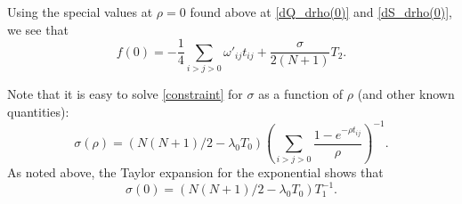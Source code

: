 \documentclass[12pt,leqno]{article}
\begin{document}
Using the special values at $\rho=0$ found above at \eqref{dQ_drho(0)} and \eqref{dS_drho(0)}, we see that
$$
f(0) = -\frac{1}{4}\sum_{i>j>0}\omega'_{ij}t_{ij} +\frac{\sigma}{2(N+1)}T_2.
$$

Note that it is easy to solve \eqref{constraint} for $\sigma$ as a function of $\rho$ (and other
known quantities):
\begin{equation}\label{eq4}
  \sigma(\rho) = (N(N+1)/2 - \lambda_0T_0)\left(\sum_{i>j>0}\frac{1-e^{-\rho t_{ij}}}{\rho}\right)^{-1}.
\end{equation}
As noted above, the Taylor expansion for the exponential shows that
$$
\sigma(0) = (N(N+1)/2 - \lambda_0T_0)T_1^{-1}.
$$



\end{document}

